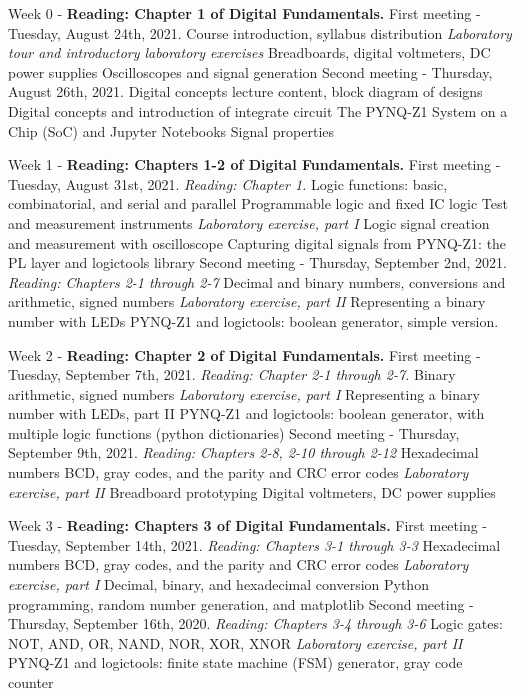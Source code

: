 \documentclass[10pt]{article}
\begin{document}
\begin{outline}[enumerate]

\1 Week 0 - \textbf{Reading: Chapter 1 of Digital Fundamentals.}
\2 First meeting - Tuesday, August 24th, 2021.
\3 Course introduction, syllabus distribution
\3 \textit{Laboratory tour and introductory laboratory exercises}
\4 Breadboards, digital voltmeters, DC power supplies
\4 Oscilloscopes and signal generation
\2 Second meeting - Thursday, August 26th, 2021.
\3 Digital concepts lecture content, block diagram of designs
\3 Digital concepts and introduction of integrate circuit
\4 The PYNQ-Z1 System on a Chip (SoC) and Jupyter Notebooks
\4 Signal properties

\1 Week 1 - \textbf{Reading: Chapters 1-2 of Digital Fundamentals.}
\2 First meeting - Tuesday, August 31st, 2021. \textit{Reading: Chapter 1.}
\3 Logic functions: basic, combinatorial, and serial and parallel
\3 Programmable logic and fixed IC logic
\3 Test and measurement instruments
\3 \textit{Laboratory exercise, part I}
\4 Logic signal creation and measurement with oscilloscope
\4 Capturing digital signals from PYNQ-Z1: the PL layer and logictools library
\2 Second meeting - Thursday, September 2nd, 2021. \textit{Reading: Chapters 2-1 through 2-7}
\3 Decimal and binary numbers, conversions and arithmetic, signed numbers
\3 \textit{Laboratory exercise, part II}
\4 Representing a binary number with LEDs
\4 PYNQ-Z1 and logictools: boolean generator, simple version.

\1 Week 2 - \textbf{Reading: Chapter 2 of Digital Fundamentals.}
\2 First meeting - Tuesday, September 7th, 2021. \textit{Reading: Chapter 2-1 through 2-7.}
\3 Binary arithmetic, signed numbers
\3 \textit{Laboratory exercise, part I}
\4 Representing a binary number with LEDs, part II
\4 PYNQ-Z1 and logictools: boolean generator, with multiple logic functions (python dictionaries)
\2 Second meeting - Thursday, September 9th, 2021. \textit{Reading: Chapters 2-8, 2-10 through 2-12}
\3 Hexadecimal numbers
\3 BCD, gray codes, and the parity and CRC error codes
\3 \textit{Laboratory exercise, part II}
\4 Breadboard prototyping
\4 Digital voltmeters, DC power supplies

\1 Week 3 - \textbf{Reading: Chapters 3 of Digital Fundamentals.}
\2 First meeting - Tuesday, September 14th, 2021.  \textit{Reading: Chapters 3-1 through 3-3}
\3 Hexadecimal numbers
\3 BCD, gray codes, and the parity and CRC error codes
\3 \textit{Laboratory exercise, part I}
\4 Decimal, binary, and hexadecimal conversion
\4 Python programming, random number generation, and matplotlib
\2 Second meeting - Thursday, September 16th, 2020. \textit{Reading: Chapters 3-4 through 3-6}
\3 Logic gates: NOT, AND, OR, NAND, NOR, XOR, XNOR
\3 \textit{Laboratory exercise, part II}
\4 PYNQ-Z1 and logictools: finite state machine (FSM) generator, gray code counter


\end{outline}
\end{document}
